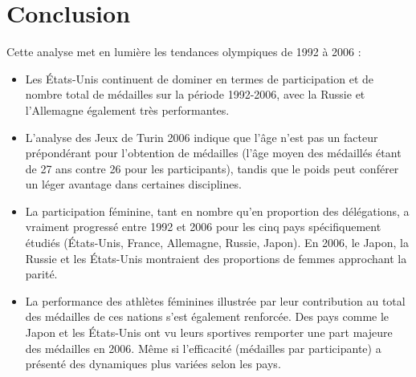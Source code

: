 \documentclass[fontsize=10pt,oneside]{scrreprt}
\begin{document}
\chapter*{Conclusion}
Cette analyse met en lumière les tendances olympiques de 1992 à 2006 :
\begin{itemize}
    \item Les États-Unis continuent de dominer en termes de participation et de nombre total de médailles sur la période 1992-2006, avec la Russie et l'Allemagne également très performantes.
    \item L'analyse des Jeux de Turin 2006 indique que l'âge n'est pas un facteur prépondérant pour l'obtention de médailles (l'âge moyen des médaillés étant de 27 ans contre 26 pour les participants), tandis que le poids peut conférer un léger avantage dans certaines disciplines.
    \item La participation féminine, tant en nombre qu'en proportion des délégations, a vraiment progressé entre 1992 et 2006 pour les cinq pays spécifiquement étudiés (États-Unis, France, Allemagne, Russie, Japon). En 2006, le Japon, la Russie et les États-Unis montraient des proportions de femmes approchant la parité.
    \item La performance des athlètes féminines illustrée par leur contribution au total des médailles de ces nations s'est également renforcée. Des pays comme le Japon et les États-Unis ont vu leurs sportives remporter une part majeure des médailles en 2006. Même si l'efficacité (médailles par participante) a présenté des dynamiques plus variées selon les pays.
\end{itemize}
\end{document}
